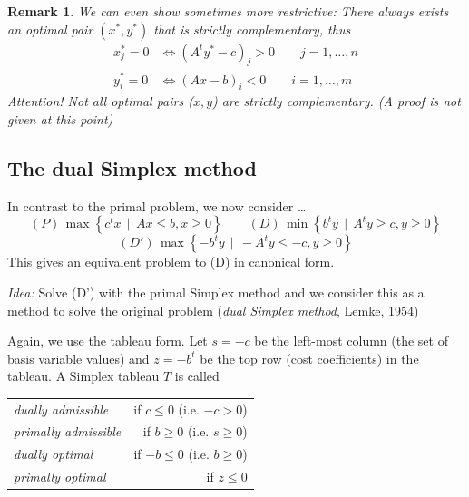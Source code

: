 \documentclass[a4paper]{article}
\numberwithin{lecref}{subsection}
\newtheorem*{Remark}{Remark}
\newcommand{\SetDef}[2]{\left\{#1\,\mid\,#2\right\}}
\begin{document}
\begin{Remark}
	We can even show sometimes more restrictive:
	There always exists an optimal pair $(x^*, y^*)$ that is strictly complementary, thus
	\begin{align*}
		x^*_j = 0 &\iff (A^t y^* - c)_j > 0 \qquad j = 1, \dots, n \\
		y^*_i = 0 &\iff (Ax - b)_i < 0 \qquad i = 1, \dots, m
	\end{align*}
	\emph{Attention!} Not all optimal pairs ($x, y$) are strictly complementary. (A proof is not given at this point)
\end{Remark}

\subsection{The dual Simplex method}
\label{section:4.4}

In contrast to the primal problem, we now consider \dots
\[ (P) \, \max\SetDef{c^t x}{Ax \leq b, x \geq 0} \qquad (D) \, \min\SetDef{b^t y}{A^t y \geq c, y \geq 0} \]
\[ (D') \, \max\SetDef{-b^t y}{-A^t y \leq -c, y \geq 0} \]
This gives an equivalent problem to (D) in canonical form.

\emph{Idea:} Solve (D') with the primal Simplex method and we consider this as a method to solve the original problem (\emph{dual Simplex method}, Lemke, 1954)

Again, we use the tableau form.
Let $s = -c$ be the left-most column (the set of basis variable values) and $z = -b^t$ be the top row (cost coefficients) in the tableau.
A Simplex tableau $T$ is called
\begin{tabular}{lr}
  \emph{dually admissible}\index{Dually admissible Simplex tableau} & if $c \leq 0$ (i.e. $-c > 0$) \\
  \emph{primally admissible}\index{Primally admissible Simplex tableau} & if $b \geq 0$ (i.e. $s \geq 0$) \\
  \emph{dually optimal}\index{Dually optimal Simplex tableau} & if $-b \leq 0$ (i.e. $b \geq 0$) \\
  \emph{primally optimal}\index{Primally optimal Simplex tableau} & if $z \leq 0$
\end{tabular}
\end{document}
